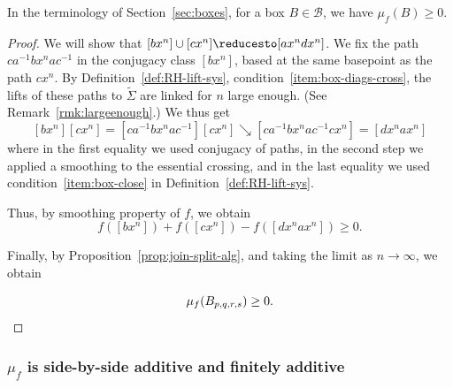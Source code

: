 \begin{proposition}
  \label{prop:positivity}
  In the terminology of Section~\ref{sec:boxes}, for a box $B\in
  \mathcal{B}$, we have $\mu_f(B) \geq 0$.
\end{proposition}

\begin{proof}
  We will show that $[b x^n] \cup [c x^n] \reducesto [a x^nd x^n]$.
  We fix the path $ca^{-1}bx^nac^{-1}$ in the conjugacy class $[bx^n]$, based at the same basepoint as the path $cx^n$.
  By Definition~\ref{def:RH-lift-sys},
  condition~\ref{item:box-diags-cross}, the lifts of these paths to
  $\tilde{\Sigma}$ are linked for $n$ large enough. (See
  Remark~\ref{rmk:largeenough}.)
  We thus get
  \[
     [bx^n][cx^n] = [ca^{-1}bx^nac^{-1}][cx^n] \searrow [ca^{-1}bx^nac^{-1}cx^n] = [dx^nax^n]
  \]  
  where in the first equality we used conjugacy of paths, in the second step we applied a smoothing to the essential crossing, and in the last equality we used condition~\ref{item:box-close} in  Definition~\ref{def:RH-lift-sys}.
  
   Thus, by smoothing property of $f$, we obtain
\[
f([bx^n]) + f([cx^n]) -f([dx^nax^n]) \geq 0.
\]
  
  Finally, by Proposition~\ref{prop:join-split-alg}, and taking the
  limit as $n \to \infty$, we obtain
  
  \[
  \mu_f(B_{p,q,r,s}) \geq 0. \qedhere
  \]
\end{proof}

 \begin{figure}
  \end{figure}
\subsubsection{$\mu_f$ is side-by-side additive and finitely additive}

